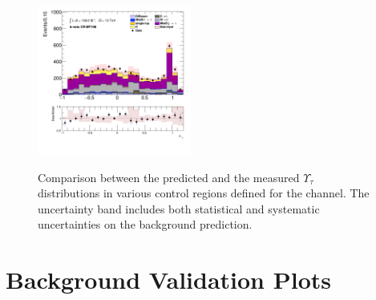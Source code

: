 \begin{figure}[!htp]
\begin{center}
			\includegraphics[width=0.45\textwidth]{chapters/chapter6_HPlus/images/taujets/tau_0_upsilon_BVETO_MT100.png} \\
			\end{center}
			\caption{
			Comparison between the predicted and the measured $\Upsilon_{\tau}$ distributions in various control regions defined for the \taujets channel. The uncertainty band includes both statistical and systematic uncertainties on the background prediction. 
			}
			\label{fig:bkg-met-phi-taujets}
		\end{figure}

		\clearpage
	\section{\taulep Background Validation Plots}\label{sec:taulep-valid-plots}
		\clearpage

